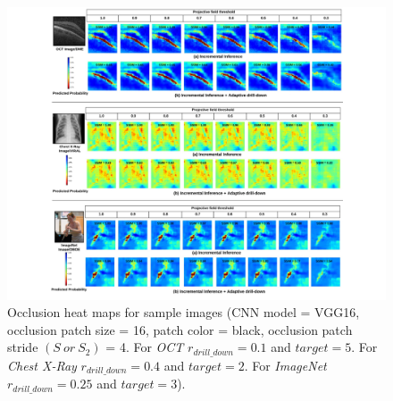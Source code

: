 \begin{figure}[t]
\includegraphics[width=\textwidth]{visualsjpeg}
\caption{Occlusion heat maps for sample images (CNN model = VGG16, occlusion patch size = 16, patch color = black, occlusion patch stride $(S~or~S_2)$ = 4. For \textit{OCT} $r_{drill\_down}=0.1$ and $\mathit{target}=5$. For \textit{Chest X-Ray} $r_{drill\_down}=0.4$ and $\mathit{target}=2$. For \textit{ImageNet} $r_{drill\_down}=0.25$ and $\mathit{target}=3$).}
\label{fig:visual_examples}
\end{figure}